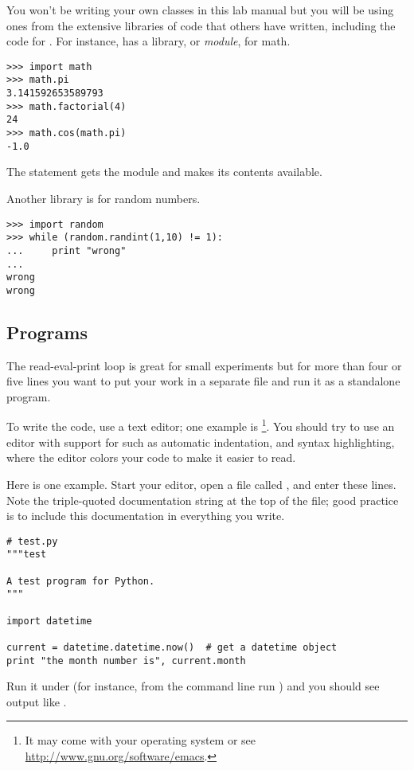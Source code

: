 You won't be writing your own classes in this lab manual 
but you will be using ones from
the extensive libraries of code that others have written, including the
code for \Sage. 
For instance, \python{} has a library, or \textit{module}, for math.
\begin{lstlisting}[style=python]
>>> import math
>>> math.pi
3.141592653589793
>>> math.factorial(4)
24
>>> math.cos(math.pi)
-1.0
\end{lstlisting}
The  statement gets the module and makes
its contents available.

Another library is for random numbers.
\begin{lstlisting}[style=python]
>>> import random
>>> while (random.randint(1,10) != 1):
...     print "wrong"
... 
wrong
wrong
\end{lstlisting}



\subsection{Programs}
The read-eval-print loop is great for small experiments but
for more than four or five lines you 
want to put your work in a separate file and run it as a standalone program.

To write the code, use a text editor; one example is 
\footnote{It may come with your operating system or 
see \protect\url{http://www.gnu.org/software/emacs}.}.
You should try to use an editor with support for \python{} such as
automatic indentation, and  
syntax highlighting, where the editor colors your code to make it easier to
read.

Here is one example.
Start your editor, open a file called , and enter these lines.
Note the triple-quoted documentation string at the top of the file; 
good practice is to include this documentation in everything you write.
\begin{lstlisting}[style=python]
# test.py
"""test

A test program for Python. 
"""

import datetime
 
current = datetime.datetime.now()  # get a datetime object
print "the month number is", current.month
\end{lstlisting}
Run it under \python{} (for instance, from the command line
run ) and you should see
output like .

